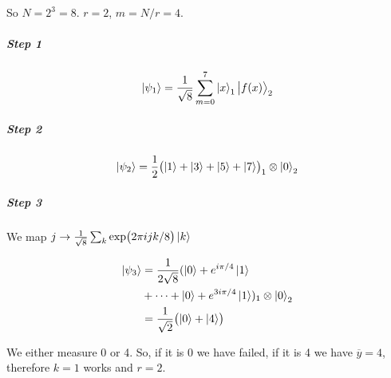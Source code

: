 So \( N = 2^3 = 8 \). \( r=2 \), \( m = N/r = 4 \).

\subparagraph{Step 1}

\begin{equation}
  \ket{\psi _1 }  =  \frac{1}{\sqrt{8}} \sum_{m=0} ^{7} \ket{x}_1 \ket{f(x)}_2
\end{equation}

\subparagraph{Step 2}

\begin{equation}
  \ket{\psi_2} = \frac{1}{2} \qty(\ket{1}+\ket{3}+\ket{5}+\ket{7})_1 \otimes \ket{0}_2
\end{equation}

\subparagraph{Step 3}

We map \( j \rightarrow \frac{1}{\sqrt{8}} \sum_k \exp(2 \pi i j k / 8) \ket{k} \)


\begin{subequations}
\begin{align}
  \ket{\psi_3}
  &= \frac{1}{2 \sqrt{8}} (\ket{0} + e^{i \pi/4} \ket{1} \\
  &+ \dots + \ket{0} + e^{3 i \pi /4}\ket{1})_1 \otimes \ket{0}_2 \\
  &= \frac{1}{\sqrt{2}} \qty(\ket{0}+\ket{4} )
\end{align}
\end{subequations}

We either measure 0 or 4. So, if it is 0 we have failed, if it is 4 we have \( \overline{y} = 4 \), therefore \( k=1 \)  works and \( r=2 \).
